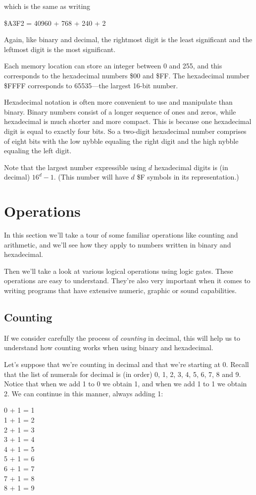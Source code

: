 which is the same as writing

\begin{center}
	\$A3F2 = 40960 + 768 + 240 + 2
\end{center}

Again, like binary and decimal, the rightmost digit is the least significant and the leftmost digit is the most significant.

Each memory location can store an integer between 0 and 255, and this corresponds to the hexadecimal numbers \$00 and \$FF. The hexadecimal number \$FFFF corresponds to 65535---the largest 16-bit number.

Hexadecimal notation is often more convenient to use and manipulate than binary. Binary numbers consist of a longer sequence of ones and zeros, while hexadecimal is much shorter and more compact. This is because one hexadecimal digit is equal to exactly four bits. So a two-digit hexadecimal number comprises of eight bits with the low nybble equaling the right digit and the high nybble equaling the left digit.

Note that the largest number expressible using $d$ hexadecimal digits is (in decimal) $16^{d} - 1$. (This number will have $d$ \$F symbols in its representation.)

\section{Operations}
In this section we'll take a tour of some familiar operations like counting and arithmetic, and we'll see how they apply to numbers written in binary and hexadecimal.

Then we'll take a look at various logical operations using logic gates. These operations are easy to understand. They're also very important when it comes to writing programs that have extensive numeric, graphic or sound capabilities.

\subsection{Counting}
If we consider carefully the process of {\it counting} in decimal, this will help us to understand how counting works when using binary and hexadecimal.

Let's suppose that we're counting in decimal and that we're starting at 0. Recall that the list of numerals for decimal is (in order) 0, 1, 2, 3, 4, 5, 6, 7, 8 and 9. Notice that when we add 1 to 0 we obtain 1, and when we add 1 to 1 we obtain 2. We can continue in this manner, always adding 1:
\begin{center}
	0 + 1 = 1  \\
	1 + 1 = 2  \\
	2 + 1 = 3  \\
	3 + 1 = 4  \\
	4 + 1 = 5  \\
	5 + 1 = 6  \\
	6 + 1 = 7  \\
	7 + 1 = 8  \\
	8 + 1 = 9  \\
\end{center}

